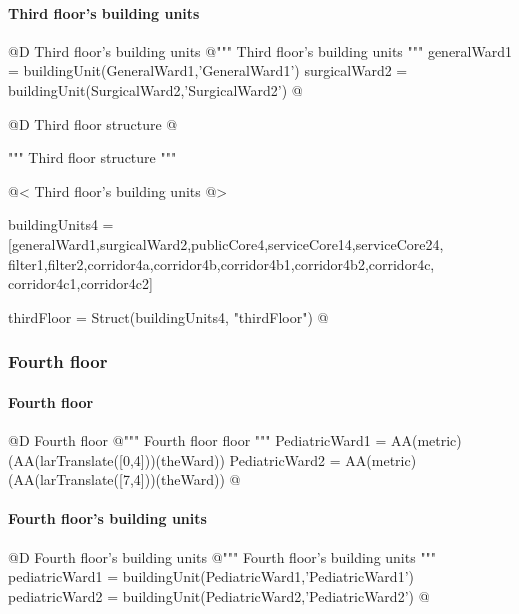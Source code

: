 \documentclass[11pt,oneside]{article}    %
\begin{document}
\paragraph{Third floor's building units}
@D Third floor's building units 
@{""" Third floor's building units """
generalWard1 = buildingUnit(GeneralWard1,'GeneralWard1')
surgicalWard2 = buildingUnit(SurgicalWard2,'SurgicalWard2')
@}

@D Third floor structure
@{""" Third floor structure """

@< Third floor's building units @>

buildingUnits4 = [generalWard1,surgicalWard2,publicCore4,serviceCore14,serviceCore24,
                filter1,filter2,corridor4a,corridor4b,corridor4b1,corridor4b2,corridor4c,
                corridor4c1,corridor4c2]

thirdFloor = Struct(buildingUnits4, "thirdFloor")
@}


\subsubsection{Fourth floor}
\paragraph{Fourth floor}
@D Fourth floor
@{""" Fourth floor floor """
PediatricWard1 = AA(metric)(AA(larTranslate([0,4]))(theWard))
PediatricWard2 = AA(metric)(AA(larTranslate([7,4]))(theWard))
@}

\paragraph{Fourth floor's building units}
@D Fourth floor's building units 
@{""" Fourth floor's building units """
pediatricWard1 = buildingUnit(PediatricWard1,'PediatricWard1')
pediatricWard2 = buildingUnit(PediatricWard2,'PediatricWard2')
@}
\end{document}
